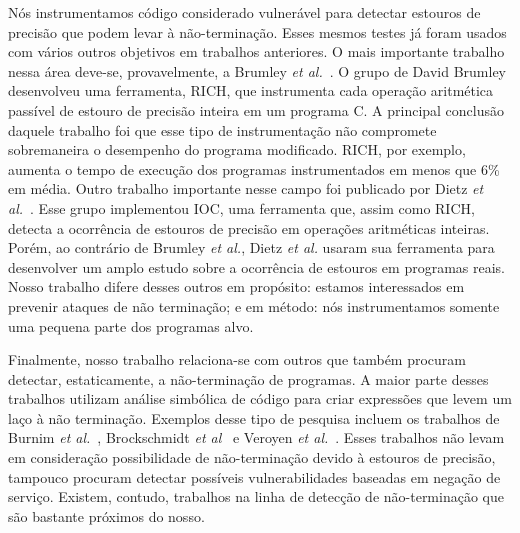 \documentclass{llncs}
\begin{document}
Nós instrumentamos código considerado vulnerável para detectar estouros de
precisão que podem levar à não-terminação.
Esses mesmos testes já foram usados com vários outros objetivos em trabalhos
anteriores.
O mais importante trabalho nessa área deve-se, provavelmente, a Brumley
{\em et al.}~\cite{Brumley07}.
O grupo de David Brumley desenvolveu uma ferramenta, RICH, que instrumenta
cada operação aritmética passível de estouro de precisão inteira em um programa
C.
A principal conclusão daquele trabalho foi que esse tipo de instrumentação
não compromete sobremaneira o desempenho do programa modificado.
RICH, por exemplo, aumenta o tempo de execução dos programas instrumentados
em menos que 6\% em média.
Outro trabalho importante nesse campo foi publicado por Dietz
{\em et al.}~\cite{Dietz12}.
Esse grupo implementou IOC, uma ferramenta que, assim como RICH, detecta a
ocorrência de estouros de precisão em operações aritméticas inteiras.
Porém, ao contrário de Brumley {\em et al.}, Dietz {\em et al.} usaram sua
ferramenta para desenvolver um amplo estudo sobre a ocorrência de estouros
em programas reais.
Nosso trabalho difere desses outros em propósito: estamos interessados em
prevenir ataques de não terminação; e em método: nós instrumentamos somente uma
pequena parte dos programas alvo.

Finalmente, nosso trabalho relaciona-se com outros que também procuram
detectar, estaticamente, a não-terminação de programas.
A maior parte desses trabalhos utilizam análise simbólica de código para criar
expressões que levem um laço à não terminação.
Exemplos desse tipo de pesquisa incluem os trabalhos de Burnim
{\em et al.}~\cite{Burnim09}, Brockschmidt {\em et al}~\cite{Brockschmidt11} e
Veroyen {\em et al.}~\cite{Velroyen08}.
Esses trabalhos não levam em consideração possibilidade de não-terminação
devido à estouros de precisão, tampouco procuram detectar possíveis
vulnerabilidades baseadas em negação de serviço.
Existem, contudo, trabalhos na linha de detecção de não-terminação que são
bastante próximos do nosso.
\end{document}
